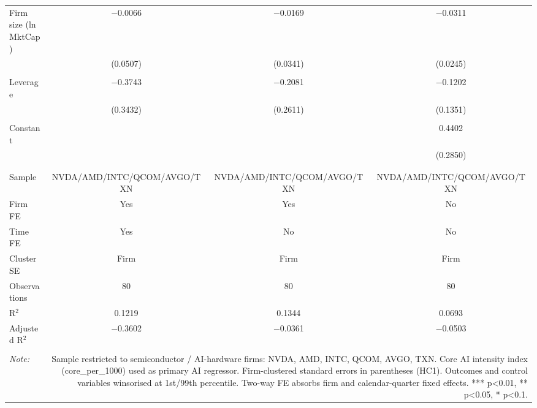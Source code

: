 \begin{table}[!htbp]
\begin{tabular}{@{\extracolsep{5pt}}lccc}
 Firm size (ln MktCap) & $-$0.0066 & $-$0.0169 & $-$0.0311 \\ 
  & (0.0507) & (0.0341) & (0.0245) \\ 
  & & & \\ 
 Leverage & $-$0.3743 & $-$0.2081 & $-$0.1202 \\ 
  & (0.3432) & (0.2611) & (0.1351) \\ 
  & & & \\ 
 Constant &  &  & 0.4402 \\ 
  &  &  & (0.2850) \\ 
  & & & \\ 
\hline \\[-1.8ex] 
Sample & NVDA/AMD/INTC/QCOM/AVGO/TXN & NVDA/AMD/INTC/QCOM/AVGO/TXN & NVDA/AMD/INTC/QCOM/AVGO/TXN \\ 
Firm FE & Yes & Yes & No \\ 
Time FE & Yes & No & No \\ 
Cluster SE & Firm & Firm & Firm \\ 
Observations & 80 & 80 & 80 \\ 
R$^{2}$ & 0.1219 & 0.1344 & 0.0693 \\ 
Adjusted R$^{2}$ & $-$0.3602 & $-$0.0361 & $-$0.0503 \\ 
\hline 
\hline \\[-1.8ex] 
\textit{Note:}  & \multicolumn{3}{r}{Sample restricted to semiconductor / AI-hardware firms: NVDA, AMD, INTC, QCOM, AVGO, TXN. Core AI intensity index (core_per_1000) used as primary AI regressor. Firm-clustered standard errors in parentheses (HC1). Outcomes and control variables winsorised at 1st/99th percentile. Two-way FE absorbs firm and calendar-quarter fixed effects. *** p<0.01, ** p<0.05, * p<0.1.} \\ 
\end{tabular} 
\end{table} 
